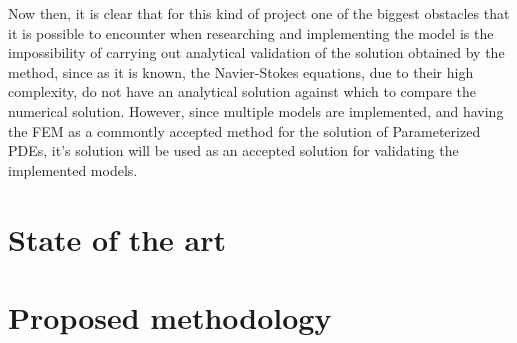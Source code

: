 \documentclass[12pt,letterpaper]{article}
\begin{document}
Now then, it is clear that for this kind of project one of the biggest obstacles that it is possible
to encounter when researching and implementing the model is the impossibility of carrying out
analytical validation of the solution obtained by the method, since as it is known, the Navier-Stokes
equations, due to their high complexity, do not have an analytical solution against which to compare
the numerical solution. However, since multiple models are implemented, and having the FEM as a commontly
accepted method for the solution of Parameterized PDEs, it's solution will be used as an accepted solution 
for validating the implemented models. 

\section{State of the art}

\section{Proposed methodology}

\end{document}
